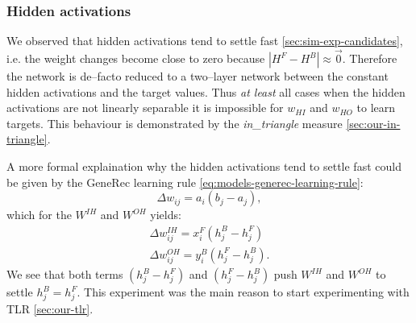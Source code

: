 
\subsubsection{Hidden activations}
\label{sec:our-hidden-activation} 

We observed that hidden activations tend to settle fast \ref{sec:sim-exp-candidates}, i.e. the weight changes become close to zero because $|H^F - H^B| \approx \overrightarrow{0}$. Therefore the network is de--facto reduced to a two--layer network between the constant hidden activations and the target values. Thus \emph{at least} all cases when the hidden activations are not linearly separable it is impossible for $w_{HI}$ and $w_{HO}$ to learn targets. This behaviour is demonstrated by the \emph{in\_triangle} measure \ref{sec:our-in-triangle}. 

A more formal explaination why the hidden activations tend to settle fast could be given by the GeneRec learning rule \ref{eq:models-generec-learning-rule}: 
\begin{equation} 
  \Delta w_{ij} = a_i(b_j - a_j),
\end{equation} \nonumber 
which for the $W^{IH}$ and $W^{OH}$ yields: 
\begin{align} 
  \Delta w_{ij}^{IH} = x^F_i(h^B_j - h^F_j) \nonumber \\ 
  \Delta w_{ij}^{OH} = y^B_i(h^F_j - h^B_j). \nonumber  
\end{align} 
We see that both terms $(h^B_j - h^F_j)$ and $(h^F_j - h^B_j)$ push $W^{IH}$ and $W^{OH}$ to settle $h^B_j = h^F_j$. This experiment was the main reason to start experimenting with TLR \ref{sec:our-tlr}. 

